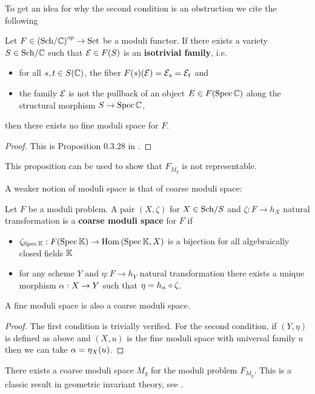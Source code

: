To get an idea for why the second condition is an obstruction we cite the following
\begin{proposition}
Let $F\in \left({\mathrm{Sch}}/{\mathbb{C}}\right)^{op}\to \mathrm{Set}$ be a moduli functor. If there exists a variety $S\in {\mathrm{Sch}}/{\mathbb{C}}$ such that $\mathcal{E}\in F(S)$ is an \textbf{isotrivial family}, i.e.
\begin{itemize}
\item for all $s,t\in S(\mathbb{C})$, the fiber $F(s)(\mathcal{E})=\mathcal{E}_s=\mathcal{E}_t$ and
\item the family $\mathcal{E}$ is not the pullback of an object $E\in F(\mathrm{Spec}\, \mathbb{C})$ along the structural morphism $S\to \mathrm{Spec}\, \mathbb{C}$,
\end{itemize}
then there exists no fine moduli space for $F$.
\end{proposition}
\begin{proof}
This is Proposition 0.3.28 in \cite{Alper}.
\end{proof}
\begin{remark}
This proposition can be used to show that $F_{M_g}$ is not representable.
\end{remark}

A weaker notion of moduli space is that of coarse moduli space:
\begin{definition}
Let $F$ be a moduli problem. A pair $(X,\zeta)$ for $X\in {\mathrm{Sch}}/{S}$ and $\zeta:F\to h_X$ natural transformation is a \textbf{coarse moduli space} for $F$ if
\begin{itemize}
\item $\zeta_{\mathrm{Spec}\, \mathbb{K}}:F(\mathrm{Spec}\,\mathbb{K})\to \mathrm{Hom}\,(\mathrm{Spec}\,\mathbb{K},X)$ is a bijection for all algebraically closed fields $\mathbb{K}$
\item for any scheme $Y$ and $\eta:F\to h_{Y}$ natural transformation there exists a unique morphism $\alpha:X\to Y$ such that $\eta=h_\alpha\circ \zeta$.
\end{itemize}
\end{definition}
\begin{proposition}
A fine moduli space is also a coarse moduli space.
\end{proposition}
\begin{proof}
The first condition is trivially verified. For the second condition, if $(Y,\eta)$ is defined as above and $(X,u)$ is the fine moduli space with universal family $u$ then we can take $\alpha=\eta_X(u)$.
\end{proof}

\begin{remark}
There exists a coarse moduli space $M_g$ for the moduli problem $F_{M_g}$. This is a classic result in geometric invariant theory, see \cite{GIT}.
\end{remark}


